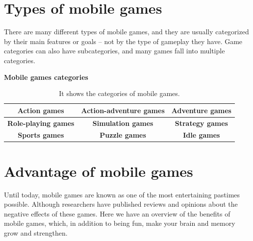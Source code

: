 \documentclass[10pt,a4paper]{article}
\begin{document}
\section{Types of mobile games}%
There are many different types of mobile games, and they are usually categorized by their main features or goals – not by the type of gameplay they have.
Game categories can also have subcategories, and many games fall into multiple categories.~\cite{idtech}
\begin{table}[h]
\textbf{Mobile games categories}\\ 
\begin{tabular}{|c |c |c| }
 \hline\hline
  \textbf{Action games} & \textbf{Action-adventure games} & \textbf{Adventure games} \\ 
  \hline
 \textbf{Role-playing games} & \textbf{Simulation games} & \textbf{Strategy games} \\
 \hline
 \textbf{Sports games} &\textbf{ Puzzle games} & \textbf{Idle games} \\
 \hline
\end{tabular}
\caption{It shows the categories of mobile games.}
\label{table:1}
\end{table}
\section{Advantage of mobile games}%
Until today, mobile games are known as one of the most entertaining pastimes possible. Although researchers have published reviews and opinions about the negative effects of these games. Here we have an overview of the benefits of mobile games, which, in addition to being fun, make your brain and memory grow and strengthen.~\cite{azbigmedia}
\end{document}
